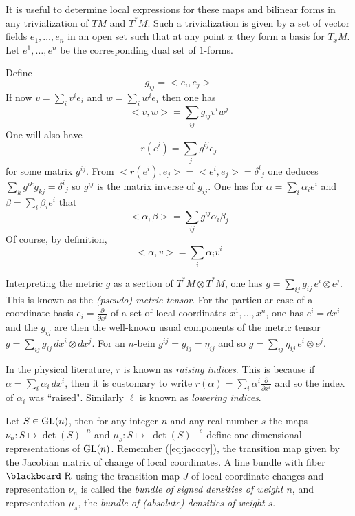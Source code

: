 \documentclass[12pt,titlepage]{article}
\def\bbf#1{\hbox{\blackboard #1}}
\def\lR{\bbf R}
\def\GL{\hbox{GL}}
\def\ppv#1#2{\frac{\partial}{\partial #1^#2}}
\begin{document}
It is useful to determine local expressions for these maps and bilinear
forms in any  trivialization of \(TM\) and \(T^*M\).  Such a 
trivialization is given by a set of vector fields \(e_1,\dots,e_n\) in an 
open set such that at any point \(x\) they form a basis for \(T_xM\). Let 
\(e^1,\dots,e^n\) be the corresponding dual set of \(1\)-forms. 

Define
\[
g_{ij} = <e_i,e_j>
\]
%
If now \(v=\sum_i v^ie_i\) and \(w = \sum_iw^ie_i\) then
one has 
\[
<v,w> = \sum_{ij}g_{ij}v^iw^j
\]
 One will also have 
\[
r(e^i)
= \sum_j g^{ij}e_j
\]
 for some matrix \(g^{ij}\).
% 
From \(<r(e^i),e_j> = <e^i,e_j> = \delta^i{}_j\)
 one deduces \(\sum_k g^{ik}g_{kj} = \delta^i{}_j\)
so \(g^{ij}\) is the matrix inverse
of \(g_{ij}\). One has for \(\alpha = \sum_i\alpha_ie^i\) and \(\beta =
\sum_i\beta_ie^i\) that 
\[
<\alpha,\beta> =
\sum_{ij}g^{ij}\alpha_i\beta_j
\]
 Of course, by definition, 
\[
<\alpha,v> =
\sum_i\alpha_iv^i
\]

Interpreting the metric \(g\) as a section of \(T^*M\otimes T^*M\), one has
\(g=\sum_{ij}g_{ij}\,e^i\otimes e^j\). This is known as the 
{\em (pseudo)-metric tensor\/}. 
%
For the particular case of a coordinate basis \(e_i = \ppv{x}{i}\) 
of a set 
of local coordinates \(x^1,\dots,x^n\),
  one has \(e^i=dx^i\) and the \(g_{ij}\) are then the well-known usual
components of the  metric tensor
 \(g=\sum_{ij}g_{ij}\,dx^i\otimes dx^j\). For 
an \(n\)-bein \(g^{ij}=g_{ij}=\eta_{ij}\) 
and so \(g=\sum_{ij}\eta_{ij}\,e^i\otimes e^j\).

In the physical literature, \(r\)  is known as {\em
raising indices\/}.
%
 This is because if
\(\alpha=\sum_i\alpha_i\,dx^i\), then it is customary to write
\(r(\alpha) = \sum_i\alpha^i\ppv{x}{i}\) and so the index of
\(\alpha_i\) was ``raised". Similarly \(\ell\) is known as 
%
{\em lowering
indices\/}.

Let \(S\in \GL(n)\), then for any integer \(n\) and any real number
\(s\) the maps \(\nu_n : S \mapsto \det (S)^{-n}\) and \(\mu_s:S
\mapsto |\det (S)|^{-s}\) define one-dimensional representations of
\(\GL(n)\). 
Remember (\ref{eq:jacocy}), the transition map given by the
Jacobian matrix of change of local coordinates.
A line bundle with fiber \(\lR\) using the transition map
\(J\) of local coordinate changes and representation \(\nu_n\) is called
the {\em bundle of signed
densities of weight \(n\)\/},
%
%
 and representation \(\mu_s\), the {\em
bundle of (absolute) densities of weight \(s\)\/}.
%
%
\end{document}

